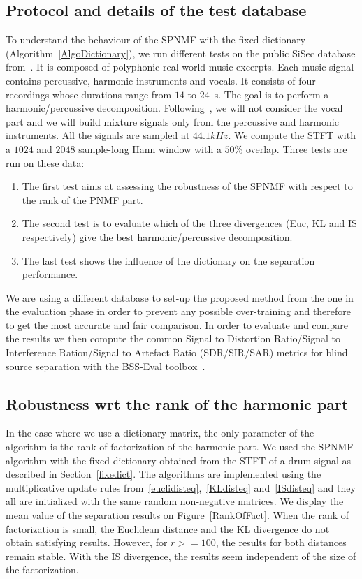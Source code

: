 \subsection{Protocol and details of the test database}


To understand the behaviour of the SPNMF with the fixed dictionary (Algorithm~\ref{AlgoDictionary}), we run different tests on the public SiSec database from~\cite{SiSec10}. It is composed of polyphonic real-world music excerpts. Each music signal contains percussive, harmonic instruments and vocals. It consists of four recordings whose durations range from $14$ to $24$~s. The goal is to perform a harmonic/percussive decomposition. Following~\cite{canadas2014percussive}, we will not consider the vocal part and we will build mixture signals only from the percussive and harmonic instruments. All the signals are sampled at $44.1kHz$. We compute the STFT with a $1024$ and $2048$ sample-long Hann window with a $50\%$ overlap.
Three tests are run on these data:
\begin{enumerate}
	\item The first test aims at assessing the robustness of the SPNMF with respect to the rank of the PNMF part. 
	\item The second test is to evaluate which of the three divergences (Euc, KL and IS respectively) give the best harmonic/percussive decomposition.
	\item The last test shows the influence of the dictionary on the separation performance. 
\end{enumerate} 
We are using a different database to set-up the proposed method from the one in the evaluation phase in order to prevent any possible over-training and therefore to get the most accurate and fair comparison. 
In order to evaluate and compare the results we then compute the common Signal to Distortion Ratio/Signal to Interference Ration/Signal to Artefact Ratio (SDR/SIR/SAR) metrics for blind source separation with the BSS-Eval toolbox~\cite{bsseval}. 


\subsection{Robustness wrt the rank of the harmonic part}
\label{setup:rank}

In the case where we use a dictionary matrix, the only parameter of the algorithm is the rank of factorization of the harmonic part. We used the SPNMF algorithm with the fixed dictionary obtained from the STFT of a drum signal as described in Section~\ref{fixedict}. The algorithms are implemented using the multiplicative update rules from~\ref{euclidisteq},~\ref{KLdisteq} and~\ref{ISdisteq} and they all are  initialized with the same random non-negative matrices. 
We display the mean value of the separation results on Figure~\ref{RankOfFact}. When the rank of factorization is small, the Euclidean distance and the KL divergence do not obtain satisfying results. However, for $r>=100$, the results for both distances remain stable. With the IS divergence, the results seem independent of the size of the factorization.

